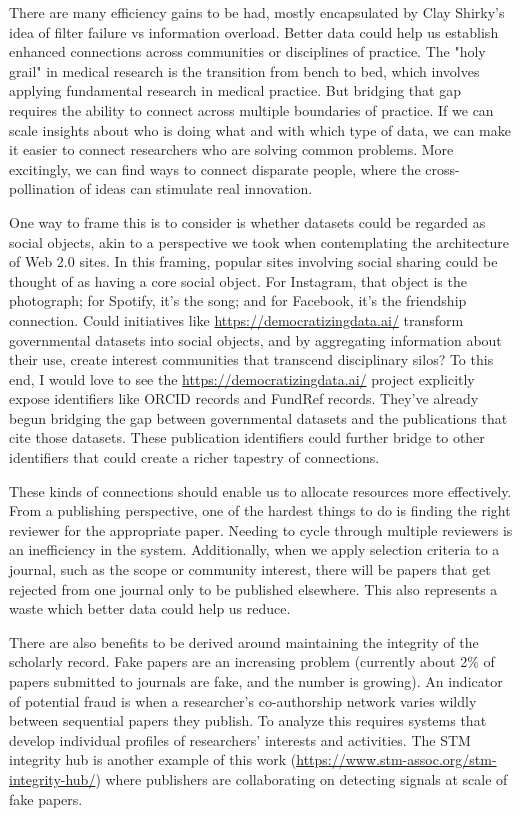 \documentclass[]{hdsr}
\begin{document}
There are many efficiency gains to be had, mostly encapsulated by Clay Shirky’s idea of filter failure vs information overload. Better data could help us establish enhanced connections across communities or disciplines of practice. The "holy grail" in medical research is the transition from bench to bed, which involves applying fundamental research in medical practice. But bridging that gap requires the ability to connect across multiple boundaries of practice. If we can scale insights about who is doing what and with which type of data, we can make it easier to connect researchers who are solving common problems. More excitingly, we can find ways to connect disparate people, where the cross-pollination of ideas can stimulate real innovation.

One way to frame this is to consider is whether datasets could be regarded as social objects, akin to a perspective we took when contemplating the architecture of Web 2.0 sites. In this framing, popular sites involving social sharing could be thought of as having a core social object. For Instagram, that object is the photograph; for Spotify, it's the song; and for Facebook, it's the friendship connection. Could initiatives like \href{https://democratizingdata.ai/}{https://democratizingdata.ai/} transform governmental datasets into social objects, and by aggregating information about their use, create interest communities that transcend disciplinary silos? To this end, I would love to see the \href{https://democratizingdata.ai/}{https://democratizingdata.ai/} project explicitly expose identifiers like ORCID records and FundRef records. They've already begun bridging the gap between governmental datasets and the publications that cite those datasets. These publication identifiers could further bridge to other identifiers that could create a richer tapestry of connections.

These kinds of connections should enable us to allocate resources more effectively. From a publishing perspective, one of the hardest things to do is finding the right reviewer for the appropriate paper. Needing to cycle through multiple reviewers is an inefficiency in the system. Additionally, when we apply selection criteria to a journal, such as the scope or community interest, there will be papers that get rejected from one journal only to be published elsewhere. This also represents a waste which better data could help us reduce.

There are also benefits to be derived around maintaining the integrity of the scholarly record. Fake papers are an increasing problem (currently about 2\% of papers submitted to journals are fake, and the number is growing). An indicator of potential fraud is when a researcher's co-authorship network varies wildly between sequential papers they publish. To analyze this requires systems that develop individual profiles of researchers' interests and activities. The STM integrity hub is another example of this work (\href{https://www.stm-assoc.org/stm-integrity-hub/}{https://www.stm-assoc.org/stm-integrity-hub/}) where publishers are collaborating on detecting signals at scale of fake papers.
\end{document}

